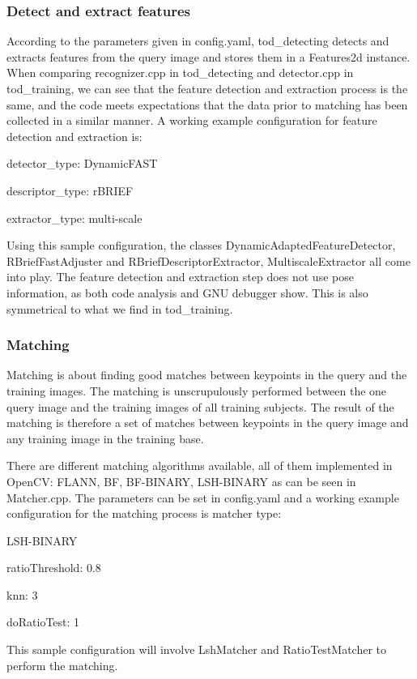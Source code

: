\subsubsection*{Detect and extract features}

According to the parameters given in config.yaml, tod\_detecting detects and
extracts features from the query image and stores them in a Features2d
instance. When comparing recognizer.cpp in tod\_detecting and detector.cpp in
tod\_training, we can see that the feature detection and extraction process is
the same, and the code meets expectations that the data prior to matching has
been collected in a similar manner. A working example configuration for feature
detection and extraction is:

detector\_type:   DynamicFAST

descriptor\_type: rBRIEF

extractor\_type:  multi-scale

Using this sample configuration, the classes DynamicAdaptedFeatureDetector,
RBriefFastAdjuster and RBriefDescriptorExtractor, MultiscaleExtractor all come
into play. The feature detection and extraction step does not use pose
information, as both code analysis and GNU debugger show. This is also
symmetrical to what we find in tod\_training.


\subsubsection*{Matching}

Matching is about finding good matches between keypoints in the query and the
training images. The matching is unscrupulously performed between the one query
image and the training images of all training subjects. The result of the
matching is therefore a set of matches between keypoints in the query image and
any training image in the training base.

There are different matching algorithms available, all of them implemented in
OpenCV: FLANN, BF, BF-BINARY,  LSH-BINARY as can be seen in Matcher.cpp. The
parameters can be set in config.yaml and a working example configuration for
the matching process is matcher type:

LSH-BINARY

ratioThreshold: 0.8

knn:  3

doRatioTest: 1

This sample configuration will involve LshMatcher and RatioTestMatcher to
perform the matching.

